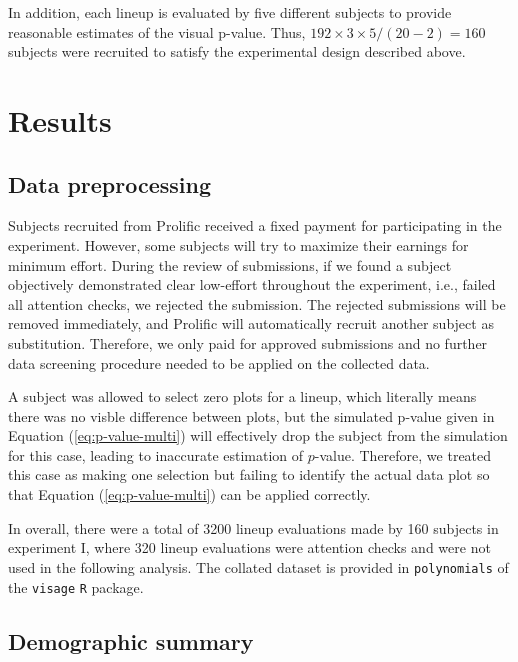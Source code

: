 \documentclass[]{interact}
\theoremstyle{plain}%
\theoremstyle{definition}
\theoremstyle{remark}
\begin{document}
In addition, each lineup is evaluated by five different subjects to
provide reasonable estimates of the visual p-value. Thus,
\(192 \times 3 \times 5 / (20 - 2) = 160\) subjects were recruited to
satisfy the experimental design described above.

\hypertarget{results}{%
\section{Results}\label{results}}

\hypertarget{data-preprocessing}{%
\subsection{Data preprocessing}\label{data-preprocessing}}

Subjects recruited from Prolific received a fixed payment for
participating in the experiment. However, some subjects will try to
maximize their earnings for minimum effort. During the review of
submissions, if we found a subject objectively demonstrated clear
low-effort throughout the experiment, i.e., failed all attention checks,
we rejected the submission. The rejected submissions will be removed
immediately, and Prolific will automatically recruit another subject as
substitution. Therefore, we only paid for approved submissions and no
further data screening procedure needed to be applied on the collected
data.

A subject was allowed to select zero plots for a lineup, which literally
means there was no visble difference between plots, but the simulated
p-value given in Equation (\ref{eq:p-value-multi}) will effectively drop
the subject from the simulation for this case, leading to inaccurate
estimation of \(p\)-value. Therefore, we treated this case as making one
selection but failing to identify the actual data plot so that Equation
(\ref{eq:p-value-multi}) can be applied correctly.

In overall, there were a total of 3200 lineup evaluations made by 160
subjects in experiment I, where 320 lineup evaluations were attention
checks and were not used in the following analysis. The collated dataset
is provided in \texttt{polynomials} of the \texttt{visage} \texttt{R}
package.

\hypertarget{demographic-summary}{%
\subsection{Demographic summary}\label{demographic-summary}}
\end{document}
